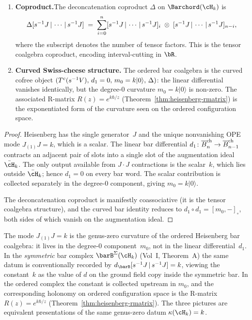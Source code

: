 \begin{theorem}
\begin{enumerate}[label=\textup{(\arabic*)}]
\item \textbf{Coproduct.}\enspace The deconcatenation coproduct
$\Delta$ on $\Barchord(\cH_k)$ is
\begin{equation}\label{eq:heisenberg-delta-ordered}
\Delta[s^{-1}J \,|\, \cdots \,|\, s^{-1}J]
\;=\;
\sum_{i=0}^{n}
[s^{-1}J \,|\, \cdots \,|\, s^{-1}J]_{i}
\;\otimes\;
[s^{-1}J \,|\, \cdots \,|\, s^{-1}J]_{n-i},
\end{equation}
where the subscript denotes the number of tensor factors.
This is the tensor coalgebra coproduct, encoding interval-cutting
in $\bR$.

\item \textbf{Curved Swiss-cheese structure.}\enspace
The ordered bar coalgebra is the curved cofree object
$(T^c(s^{-1}V),\, d_1=0,\, m_0=k\lvert 0\rangle,\,\Delta)$:
the linear differential vanishes identically, but the
degree-$0$ curvature $m_0=k\lvert 0\rangle$ is non-zero. The
associated R-matrix
$R(z)=e^{k\hbar/z}$
\textup{(}Theorem~\ref{thm:heisenberg-rmatrix}\textup{)} is the
exponentiated form of the curvature seen on the ordered
configuration space.
\end{enumerate}
\end{theorem}

\begin{proof}
Heisenberg has the single generator~$J$ and the unique
nonvanishing OPE mode $J_{(1)}J=k$, which is a scalar. The
linear bar differential
$d_1\colon\overline{B}^{\mathrm{ch}}_n\to\overline{B}^{\mathrm{ch}}_{n-1}$ contracts an adjacent pair
of slots into a single slot of the augmentation ideal
$\bar\cH_k$. The only output available from $J\cdot J$
contractions is the scalar~$k$, which lies outside
$\bar\cH_k$; hence $d_1=0$ on every bar word. The scalar
contribution is collected separately in the degree-$0$
component, giving $m_0=k\lvert 0\rangle$.

The deconcatenation coproduct is manifestly coassociative
(it is the tensor coalgebra structure), and the curved bar
identity reduces to $d_1\circ d_1=[m_0,-]_\circ$, both sides
of which vanish on the augmentation ideal.
\end{proof}

\begin{remark}
\label{rem:heisenberg-j1j}
The mode $J_{(1)}J = k$ is the genus-zero curvature of the
ordered Heisenberg bar coalgebra: it lives in the degree-$0$
component~$m_0$, not in the linear differential~$d_1$. In the
\emph{symmetric} bar complex $\barB^{\Sigma}(\cH_k)$
(Vol~I, Theorem~A) the same datum is conventionally recorded by
$d_{\barB}[\susp^{-1}J \,|\, \susp^{-1}J] = k$, viewing the
constant~$k$ as the value of $d$ on the ground field copy
inside the symmetric bar. In the ordered complex the constant
is collected upstream in $m_0$, and the corresponding holonomy
on ordered configuration space is the R-matrix
$R(z)=e^{k\hbar/z}$
(Theorem~\ref{thm:heisenberg-rmatrix}).
The three pictures are equivalent presentations of the same
genus-zero datum $\kappa(\cH_k)=k$.
\end{remark}

